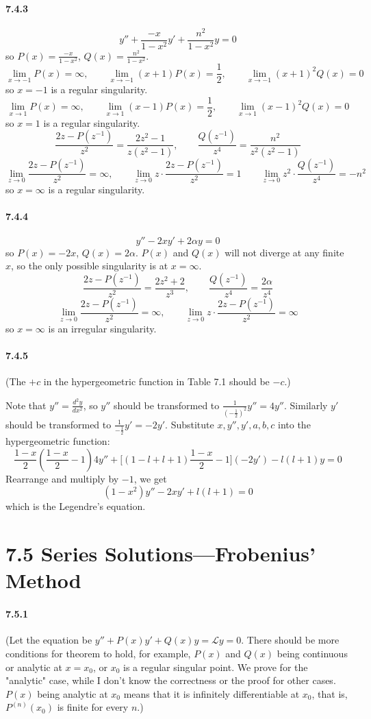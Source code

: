 \documentclass[a4paper]{article}
\begin{document}
\paragraph{7.4.3}
\[
y''+\frac{-x}{1-x^2}y'+\frac{n^2}{1-x^2}y=0
\]
so $P(x)=\frac{-x}{1-x^2}$,\; $Q(x)=\frac{n^2}{1-x^2}$.
\[
\lim_{x\to -1}P(x)=\infty,\qquad\lim_{x\to -1}(x+1)P(x)=\frac{1}{2},\qquad\lim_{x\to -1}(x+1)^2Q(x)=0
\]
so $x=-1$ is a regular singularity.
\[
\lim_{x\to 1}P(x)=\infty,\qquad\lim_{x\to 1}(x-1)P(x)=\frac{1}{2},\qquad\lim_{x\to 1}(x-1)^2Q(x)=0
\]
so $x=1$ is a regular singularity.
\[
\frac{2z-P(z^{-1})}{z^2}=\frac{2z^2-1}{z(z^2-1)},\qquad\frac{Q(z^{-1})}{z^4}=\frac{n^2}{z^2(z^2-1)}
\]
\[
\lim_{z\to0}\frac{2z-P(z^{-1})}{z^2}=\infty,\qquad\lim_{z\to0}z\cdot\frac{2z-P(z^{-1})}{z^2}=1\qquad\lim_{z\to0}z^2\cdot\frac{Q(z^{-1})}{z^4}=-n^2
\]
so $x=\infty$ is a regular singularity.

\paragraph{7.4.4}
\[
y''-2xy'+2\alpha y=0
\]
so $P(x)=-2x$, $Q(x)=2\alpha$. $P(x)$ and $Q(x)$ will not diverge at any finite $x$, so the only possible singularity is at $x=\infty$. 
\[
\frac{2z-P(z^{-1})}{z^2}=\frac{2z^2+2}{z^3},\qquad\frac{Q(z^{-1})}{z^4}=\frac{2\alpha}{z^4}
\]
\[
\lim_{z\to0}\frac{2z-P(z^{-1})}{z^2}=\infty,\qquad\lim_{z\to0}z\cdot\frac{2z-P(z^{-1})}{z^2}=\infty
\]
so $x=\infty$ is an irregular singularity.

\paragraph{7.4.5}
(The $+c$ in the hypergeometric function in Table 7.1 should be $-c$.)

Note that $y''=\frac{d^2y}{dx^2}$, so $y''$ should be transformed to $\frac{1}{(-\frac{1}{2})^2}y''=4y''$. Similarly $y'$ should be transformed to $\frac{1}{-\frac{1}{2}}y'=-2y'$.  Substitute $x,y'',y',a,b,c$ into the hypergeometric function:
\[
\frac{1-x}{2}(\frac{1-x}{2}-1)4y''+\big[(1-l+l+1)\frac{1-x}{2}-1\big](-2y')-l(l+1)y=0
\]
Rearrange and multiply by $-1$, we get
\[
(1-x^2)y''-2xy'+l(l+1)=0
\]
which is the Legendre's equation.

\section*{7.5 Series Solutions—Frobenius’ Method}

\paragraph{7.5.1}
(Let the equation be $y''+P(x)y'+Q(x)y=\mathcal{L}y=0$. There should be more conditions for theorem to hold, for example, $P(x)$ and $Q(x)$ being continuous or analytic at $x=x_0$, or $x_0$ is a regular singular point. We prove for the "analytic" case, while I don't know the correctness or the proof for other cases. $P(x)$ being analytic at $x_0$ means that it is infinitely differentiable at $x_0$, that is, $P^{(n)}(x_0)$ is finite for every $n$.)
\medskip
\end{document}

